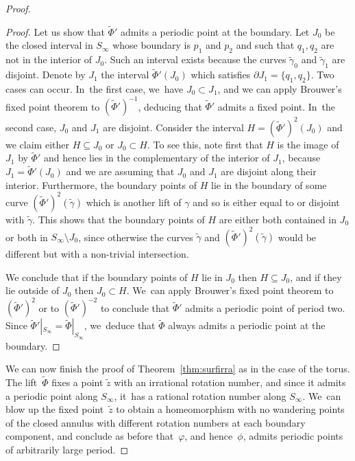\documentclass[11pt]{article}
\theoremstyle{definition}
\begin{document}
\begin{proof}
\begin{proof}
Let us show that $\widetilde \Phi'$ admits a periodic point at the boundary. Let $J_0$ be the closed interval in $S_\infty$ whose boundary is $p_1$ and $p_2$ and such that $q_1,q_2$ are not in the interior of $J_0$. Such an interval exists because the curves $\widetilde \gamma_0$ and $\widetilde \gamma_1$ are disjoint. Denote by $J_1$ the interval $\widetilde \Phi'(J_0)$ which satisfies $\partial J_1=\{q_1,q_2\}$. Two cases can occur. In~the first case, we~have $J_0\subset J_1$, and we can apply Brouwer's fixed point theorem to $(\widetilde \Phi')^{-1}$, deducing that $\widetilde \Phi'$ admits a fixed point. In~the second case, $J_0$ and $J_1$ are disjoint. Consider the interval $H=(\widetilde \Phi')^2(J_0)$ and we claim either $H\subseteq J_0$ or $J_0\subset H$. To see this, note first that $H$ is the image of $J_1$ by $\widetilde \Phi'$ and hence lies in the complementary of the interior of $J_1$, because $J_1=\widetilde \Phi'(J_0)$ and we are assuming that $J_0$ and $J_1$ are disjoint along their interior. Furthermore, the boundary points of $H$ lie in the boundary of some curve $(\widetilde \Phi')^2(\widetilde \gamma)$ which is another lift of $\gamma$ and so is either equal to or disjoint with $\widetilde \gamma$. This shows that the boundary points of $H$ are either both contained in $J_0$ or both in $S_\infty\setminus J_0$, since otherwise the curves $\widetilde \gamma$ and $(\widetilde \Phi')^2(\widetilde \gamma)$ would be different but with a non-trivial intersection.

We conclude that if the boundary points of $H$ lie in $J_0$ then $H\subseteq J_0$, and if they lie outside of $J_0$ then $J_0\subset H$. We~can apply Brouwer's fixed point theorem to $(\widetilde \Phi')^2$ or to $(\widetilde \Phi')^{-2}$ to conclude that $\widetilde \Phi'$ admits a periodic point of period two. Since $\widetilde \Phi'|_{S_\infty}=\widetilde \Phi|_{S_\infty}$, we~deduce that $\widetilde\Phi $ always admits a periodic point at the boundary.
\end{proof}

We can now finish the proof of Theorem~\ref{thm:surfirra} as in the case of the torus. The lift~$\widetilde \Phi$ fixes a point $\widetilde z$ with an irrational rotation number, and since it admits a periodic point along $S_{\infty}$, it~has a rational rotation number along $S_\infty$. We~can blow up the fixed point~$\widetilde{z}$ to obtain a homeomorphism with no wandering points of the closed annulus with different rotation numbers at each boundary component, and conclude as before that~$\varphi$, and hence~$\phi$, admits periodic points of arbitrarily large period.
\end{proof}
\end{document}
